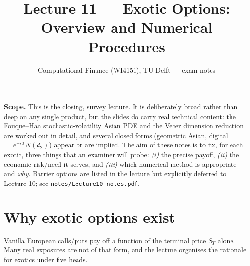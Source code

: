 \documentclass[11pt]{article}
\title{Lecture 11 --- Exotic Options: Overview and Numerical Procedures}
\author{Computational Finance (WI4151), TU Delft --- exam notes}
\date{}
\begin{document}
\maketitle

\noindent\textbf{Scope.} This is the closing, survey lecture. It is deliberately broad rather than
deep on any single product, but the slides do carry real technical content: the Fouque--Han
stochastic-volatility Asian PDE and the Vecer dimension reduction are worked out in detail, and
several closed forms (geometric Asian, digital $=e^{-rT}N(d_2)$) appear or are implied. The aim of
these notes is to fix, for each exotic, three things that an examiner will probe: \emph{(i)} the
precise payoff, \emph{(ii)} the economic risk/need it serves, and \emph{(iii)} which numerical
method is appropriate and \emph{why}. Barrier options are listed in the lecture but explicitly
deferred to Lecture 10; see \texttt{notes/Lecture10-notes.pdf}.

\section{Why exotic options exist}

Vanilla European calls/puts pay off a function of the terminal price $S_T$ alone. Many real
exposures are not of that form, and the lecture organises the rationale for exotics under five heads.
\end{document}
